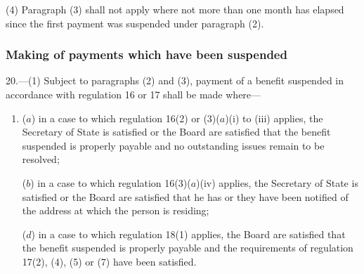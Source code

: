 \documentclass[12pt,a4paper]{article}
\begin{document}
(4) Paragraph (3) shall not apply where not more than one month has elapsed since the first payment was suspended under paragraph (2).


\subsubsection[20. Making of payments which have been suspended]{Making of payments which have been suspended}

20.—(1) Subject to paragraphs (2) and (3), payment of a benefit suspended in accordance with regulation 16 
or 17  %
shall be made where—
\begin{enumerate}\item[]
($a$) in a case to which regulation 16(2) or (3)($a$)(i) to (iii) applies, the Secretary of State is satisfied 
or the Board are satisfied  %
that the benefit suspended is properly payable and no outstanding issues remain to be resolved;

($b$) in a case to which regulation 16(3)($a$)(iv) applies, the Secretary of State is satisfied 
or the Board are satisfied  %
that he has 
or they have  %
been notified of the address at which the person is residing;



($d$) in a case to which regulation 18(1) applies, the Board are satisfied that the benefit suspended is properly payable and the requirements of regulation 17(2), (4), (5) or (7) have been satisfied.
\end{enumerate}
\end{document}
